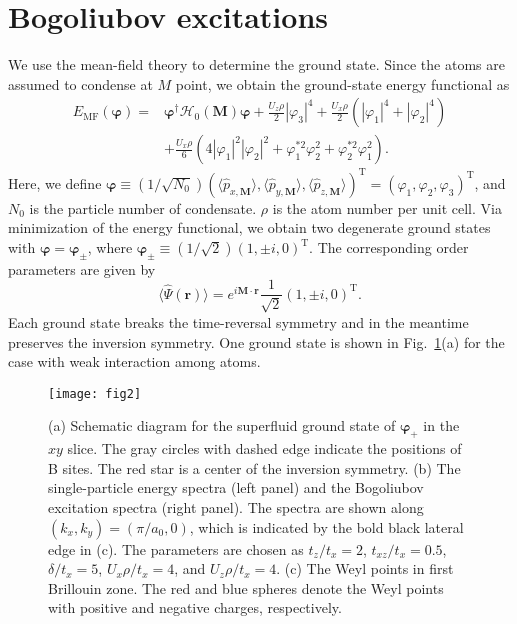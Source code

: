 \documentclass[aps,pra,floatfix,twocolumn,superscriptaddress]{revtex4-1}
\begin{document}
\section{Bogoliubov excitations}
\label{Bogoliubov}
We use the mean-field theory to determine the ground state. Since the atoms are assumed to condense at $M$ point, we obtain the ground-state energy functional as
\begin{equation}
\begin{aligned}
E_\mathrm{MF}(\bm{\varphi})=&\bm{\varphi}^\dagger \mathcal{H}_0(\mathbf{M})\bm{\varphi}+\frac{U_z\rho}{2}|\varphi_3|^4+\frac{U_x\rho}{2}(|\varphi_1|^4+|\varphi_2|^4)\\
&+\frac{U_x\rho}{6}(4|\varphi_1|^2|\varphi_2|^2+\varphi_1^{*2}\varphi_2^2+\varphi_2^{*2}\varphi_1^2).
\end{aligned}
\end{equation}
Here, we define $\bm{\varphi}\equiv(1/\sqrt{N_0})(\langle\hat{p}_{x,\mathbf{M}}\rangle,\langle\hat{p}_{y,\mathbf{M}}\rangle,\langle\hat{p}_{z,\mathbf{M}}\rangle)^\mathrm{T}=(\varphi_1,\varphi_2,\varphi_3)^\mathrm{T}$, and $N_0$ is the particle number of condensate. $\rho$ is the atom number per unit cell. Via minimization of the energy functional, we obtain two degenerate ground states with $\bm{\varphi}=\bm{\varphi}_\pm$, where $\bm{\varphi}_\pm\equiv(1/\sqrt{2})(1,\pm i,0)^\mathrm{T}$. The corresponding order parameters are given by
\begin{equation}
\langle \hat{\Psi} (\mathbf{r}) \rangle=e^{i\mathbf{M}\cdot \mathbf{r}}
\frac{1}{\sqrt{2}}(1,\pm i, 0)^\mathrm{T}.
\end{equation}
Each ground state breaks the time-reversal symmetry and in the meantime preserves the inversion symmetry. One ground state is shown in Fig.~\ref{fig2}(a) for the case with weak interaction among atoms.

\begin{figure}[htbp]
	\centering
	\texttt{[image: fig2]}
	\caption{(a) Schematic diagram for the superfluid ground state of $\bm{\varphi}_+$ in the $xy$ slice. The gray circles with dashed edge indicate the positions of B sites. The red star is a center of the inversion symmetry. (b) The single-particle energy spectra (left panel) and the Bogoliubov excitation spectra (right panel). The spectra are shown along $(k_x,k_y)=(\pi/a_0,0)$, which is indicated by the bold black lateral edge in (c). The parameters are chosen as $t_z/t_x=2$, $t_{xz}/t_x=0.5$, $\delta/t_x=5$, $U_x\rho/t_x=4$, and $U_z\rho/t_x=4$. (c) The Weyl points in first Brillouin zone. The red and blue spheres denote the Weyl points with positive and negative charges, respectively.}
	\label{fig2}
\end{figure}
\end{document}

